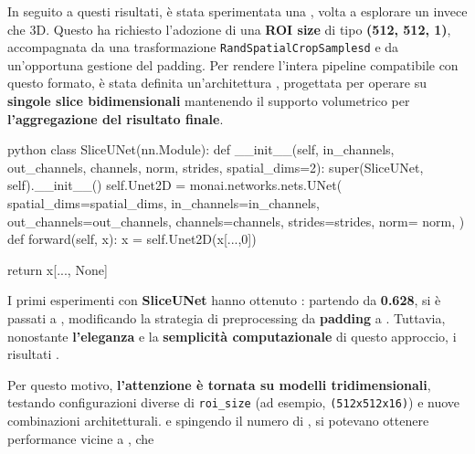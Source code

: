
In seguito a questi risultati, è stata sperimentata una , volta a esplorare un  invece che 3D. Questo ha richiesto l’adozione di una \textbf{ROI size} di tipo \textbf{(512, 512, 1)}, accompagnata da una trasformazione \texttt{RandSpatialCropSamplesd} e da un’opportuna gestione del padding. Per rendere l’intera pipeline compatibile con questo formato, è stata definita un’architettura , progettata per operare su \textbf{singole slice bidimensionali} mantenendo il supporto volumetrico per \textbf{l’aggregazione del risultato finale}.

\begin{code}{python}
class SliceUNet(nn.Module):
    def __init__(self, in_channels, out_channels, 
                channels, norm, strides, spatial_dims=2):
        super(SliceUNet, self).__init__()
        self.Unet2D = monai.networks.nets.UNet(
            spatial_dims=spatial_dims,
            in_channels=in_channels,
            out_channels=out_channels,
            channels=channels,
            strides=strides,
            norm= norm,
        )
    def forward(self, x):
        x = self.Unet2D(x[...,0]) 

        return x[..., None]
\end{code}



I primi esperimenti con \textbf{SliceUNet} hanno ottenuto : partendo da \textbf{0.628}, si è passati a , modificando la strategia di preprocessing da \textbf{padding} a . Tuttavia, nonostante \textbf{l’eleganza} e la \textbf{semplicità computazionale} di questo approccio, i risultati .


Per questo motivo, \textbf{l’attenzione è tornata su modelli tridimensionali}, testando configurazioni diverse di \texttt{roi\_size} (ad esempio, \texttt{(512x512x16)}) e nuove combinazioni architetturali.  e spingendo il numero di , si potevano ottenere performance vicine a , che 

